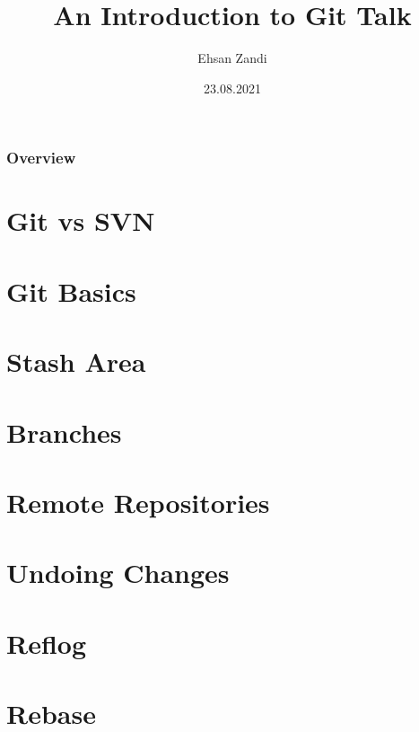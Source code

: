 \documentclass{beamer}
\title[Short title]{An Introduction to Git Talk} %
\author{Ehsan Zandi} %
\institute[DTIT] %
{
Deutsche Telekom IT \\ %
\medskip
ehsan.zandi@telekom.de
}
\date{23.08.2021} %
\begin{document}
\begin{frame}
\titlepage %
\end{frame}

\begin{frame}
\frametitle{Overview} %
\tableofcontents %
\end{frame}


\section{Git vs SVN} 
%
\section{Git Basics}





\section{Stash Area} 
\section{Branches} 
\section{Remote Repositories} 
\section{Undoing Changes} 
\section{Reflog}
\section{Rebase}
\end{document}
